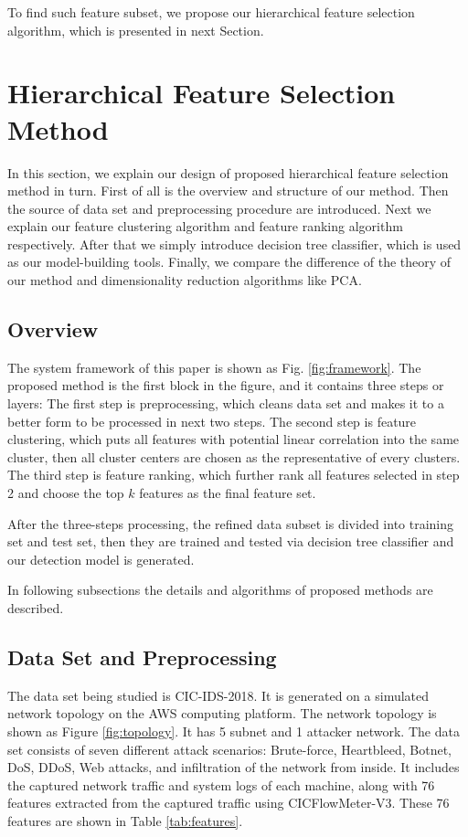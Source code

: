 \documentclass{ieeeaccess}
\theoremstyle{definition}
\begin{document}
To find such feature subset, we propose our hierarchical feature selection algorithm, which is presented in next Section.

\section{Hierarchical Feature Selection Method}
\label{sec:methods}

In this section, we explain our design of proposed hierarchical feature selection method in turn. First of all is the overview and structure of our method. Then the source of data set and preprocessing procedure are introduced. Next we explain our feature clustering algorithm and feature ranking algorithm respectively. After that we simply introduce decision tree classifier, which is used as our model-building tools. Finally, we compare the difference of the theory of our method and dimensionality reduction algorithms like PCA.

\subsection{Overview}

The system framework of this paper is shown as Fig. \ref{fig:framework}. 
The proposed method is the first block in the figure, and it contains three steps or layers: The first step is preprocessing, which cleans data set and makes it to a better form to be processed in next two steps. The second step is feature clustering, which puts all features with potential linear correlation into the same cluster, then all cluster centers are chosen as the representative of every clusters. The third step is feature ranking, which further rank all features selected in step 2 and choose the top $k$ features as the final feature set. 

After the three-steps processing, the refined data subset is divided into training set and test set, then they are trained and tested via decision tree classifier and our detection model is generated.

In following subsections the details and algorithms of proposed methods are described.

\subsection{Data Set and Preprocessing}

The data set being studied is CIC-IDS-2018\cite{cic2018}. 
It is generated on a simulated network topology on the AWS computing platform. The network topology is shown as Figure \ref{fig:topology}. It has 5 subnet and 1 attacker network.  
The data set consists of seven different attack scenarios: Brute-force, Heartbleed, Botnet, DoS, DDoS, Web attacks, and infiltration of the network from inside. It includes the captured network traffic and system logs of each machine, along with 76 features extracted from the captured traffic using CICFlowMeter-V3\cite{cicflowmeter}. These 76 features are shown in Table \ref{tab:features}.
\end{document}
